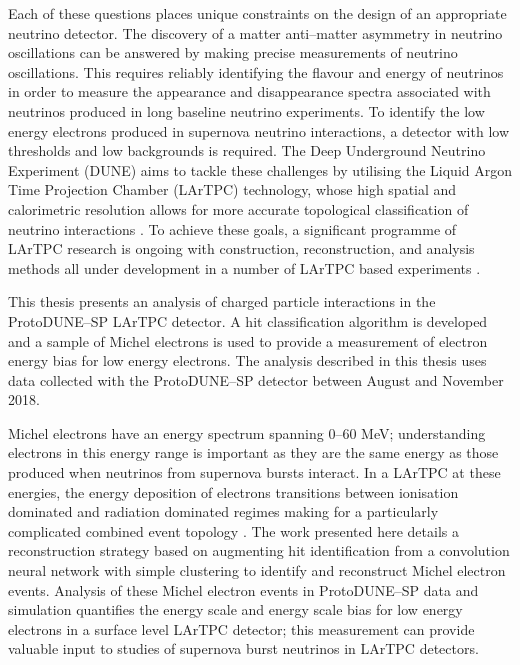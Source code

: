 Each of these questions places unique constraints on the design of an
appropriate neutrino detector. The discovery of a matter anti--matter asymmetry
in neutrino oscillations can be answered by making precise measurements of
neutrino oscillations. This requires reliably identifying the flavour and energy
of neutrinos in order to measure the appearance and disappearance spectra
associated with neutrinos produced in long baseline neutrino experiments. To
identify the low energy electrons produced in supernova neutrino interactions, a
detector with low thresholds and low backgrounds is required. The Deep
Underground Neutrino Experiment (DUNE) aims to tackle these challenges by
utilising the Liquid Argon Time Projection Chamber (LArTPC) technology, whose
high spatial and calorimetric resolution allows for more accurate topological
classification of neutrino interactions \cite{Acciarri:2016crz}. To achieve
these goals, a significant programme of LArTPC research is ongoing with
construction, reconstruction, and analysis methods all under development in a
number of LArTPC based experiments \cite{Acciarri:2016smi, Cavanna:2014iqa,
Antonello:2015lea, Abi:2017aow}. 

This thesis presents an analysis of charged particle interactions in the
ProtoDUNE--SP LArTPC detector. A hit classification algorithm is developed and a
sample of Michel electrons is used to provide a measurement of electron energy
bias for low energy electrons. The analysis described in this thesis uses data
collected with the ProtoDUNE--SP detector between August and November 2018.

Michel electrons have an energy spectrum spanning 0--60 MeV; understanding
electrons in this energy range is important as they are the same energy as those
produced when neutrinos from supernova bursts interact. In a LArTPC at these
energies, the energy deposition of electrons transitions between ionisation
dominated and radiation dominated regimes making for a particularly complicated
combined event topology \cite{Acciarri:2017sjy}. The work presented here details
a reconstruction strategy based on augmenting hit identification from a
convolution neural network with simple clustering to identify and reconstruct
Michel electron events. Analysis of these Michel electron events in
ProtoDUNE--SP data and simulation quantifies the energy scale and energy scale
bias for low energy electrons in a surface level LArTPC detector; this
measurement can provide valuable input to studies of supernova burst neutrinos
in LArTPC detectors.

